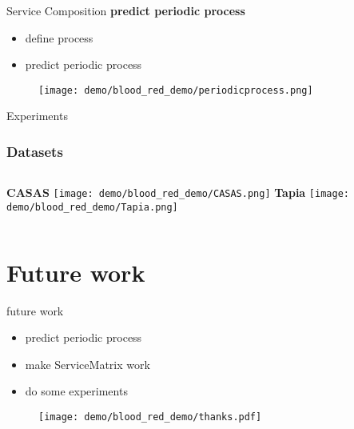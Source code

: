 \documentclass[notheorems, aspectratio=54]{beamer}
\def\parchmentframe#1{
\tikz{
  \node[inner sep=2em] (A) {#1};  %
  \begin{pgfonlayer}{background}  %
  \fill[normal border] 
        (A.south east) -- (A.south west) -- 
        (A.north west) -- (A.north east) -- cycle;
  \end{pgfonlayer}}}
\def\parchmentframetop#1{
\tikz{
  \node[inner sep=2em] (A) {#1};    %
  \begin{pgfonlayer}{background}    
  \fill[normal border]              %
        (A.south east) -- (A.south west) -- 
        (A.north west) -- (A.north east) -- cycle;
  \fill[torn border]                %
        ($(A.south east)-(0,.2)$) -- ($(A.south west)-(0,.2)$) -- 
        ($(A.south west)+(0,.2)$) -- ($(A.south east)+(0,.2)$) -- cycle;
  \end{pgfonlayer}}}
\def\parchmentframebottom#1{
\tikz{
  \node[inner sep=2em] (A) {#1};   %
  \begin{pgfonlayer}{background}   
  \fill[normal border]             %
        (A.south east) -- (A.south west) -- 
        (A.north west) -- (A.north east) -- cycle;
  \fill[torn border]               %
        ($(A.north east)-(0,.2)$) -- ($(A.north west)-(0,.2)$) -- 
        ($(A.north west)+(0,.2)$) -- ($(A.north east)+(0,.2)$) -- cycle;
  \end{pgfonlayer}}}
\def\parchmentframemiddle#1{
\tikz{
  \node[inner sep=2em] (A) {#1};   %
  \begin{pgfonlayer}{background}   
  \fill[normal border]             %
        (A.south east) -- (A.south west) -- 
        (A.north west) -- (A.north east) -- cycle;
  \fill[torn border]               %
        ($(A.south east)-(0,.2)$) -- ($(A.south west)-(0,.2)$) -- 
        ($(A.south west)+(0,.2)$) -- ($(A.south east)+(0,.2)$) -- cycle;
  \fill[torn border]               %
        ($(A.north east)-(0,.2)$) -- ($(A.north west)-(0,.2)$) -- 
        ($(A.north west)+(0,.2)$) -- ($(A.north east)+(0,.2)$) -- cycle;
  \end{pgfonlayer}}}
\newenvironment{parchment}[1][Example]{%
  \def\FrameCommand{\parchmentframe}%
  \def\FirstFrameCommand{\parchmentframetop}%
  \def\LastFrameCommand{\parchmentframebottom}%
  \def\MidFrameCommand{\parchmentframemiddle}%
  \vskip\baselineskip
  \MakeFramed {\FrameRestore}
  \noindent\tikz\node[inner sep=1ex, draw=black!20,fill=white, 
          anchor=west, overlay] at (0em, 2em) {\sffamily#1};\par}%
{\endMakeFramed}
\begin{document}
\begin{frame}{Service Composition}
    \textbf{predict periodic process}
    \begin{itemize}
        \item define process
        \item predict periodic process
    \end{itemize}
    \begin{figure}[t]
    \texttt{[image: demo/blood\_red\_demo/periodicprocess.png]}
    \centering
    \end{figure}
\end{frame}
\begin{frame}{Experiments}
    \frametitle{Datasets}
    \begin{columns}
    \textbf{CASAS}
    \texttt{[image: demo/blood\_red\_demo/CASAS.png]}
    \textbf{Tapia}
      \texttt{[image: demo/blood\_red\_demo/Tapia.png]}
    \end{columns}
\end{frame}
\section{Future work}
\begin{frame}{future work}
    \begin{itemize}
        \item predict periodic process
        \item make ServiceMatrix work
        \item do some experiments
    \end{itemize}
\end{frame}

\begin{frame}
\begin{figure}
    \centering
    \texttt{[image: demo/blood\_red\_demo/thanks.pdf]}
\end{figure}
\end{frame}



    
\end{document}
